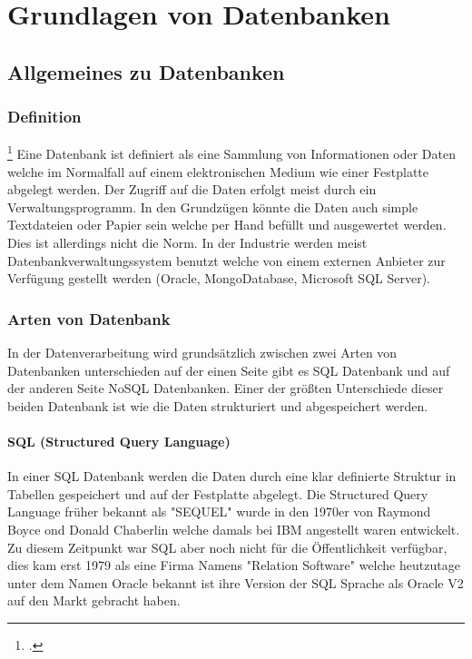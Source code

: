 \chapter{Grundlagen von Datenbanken}
\bauer

	\section{Allgemeines zu Datenbanken}
	
	\subsection{Definition}\footcite{oracle}
	Eine Datenbank ist definiert als eine Sammlung von Informationen oder Daten welche im Normalfall auf einem elektronischen Medium wie einer Festplatte abgelegt werden. Der Zugriff auf die Daten erfolgt meist durch ein Verwaltungsprogramm. In den Grundzügen könnte die Daten auch simple Textdateien oder Papier sein welche per Hand befüllt und ausgewertet werden. Dies ist allerdings nicht die Norm. In der Industrie werden meist Datenbankverwaltungssystem benutzt welche von einem externen Anbieter zur Verfügung gestellt werden (Oracle, MongoDatabase, Microsoft SQL Server).
	
	\subsection{Arten von Datenbank}
	In der Datenverarbeitung wird grundsätzlich zwischen zwei Arten von Datenbanken unterschieden auf der einen Seite gibt es SQL Datenbank und auf der anderen Seite NoSQL Datenbanken. Einer der größten Unterschiede dieser beiden Datenbank ist wie die Daten strukturiert und abgespeichert werden.
	
	\subsubsection{SQL (Structured Query Language)} 
	In einer SQL Datenbank werden die Daten durch eine klar definierte Struktur in Tabellen gespeichert und auf der Festplatte abgelegt. Die Structured Query Language früher bekannt als "SEQUEL" wurde in den 1970er von Raymond Boyce ond Donald Chaberlin welche damals bei IBM angestellt waren entwickelt. Zu diesem Zeitpunkt war SQL aber noch nicht für die Öffentlichkeit verfügbar, dies kam erst 1979 als eine Firma Namens "Relation Software" welche heutzutage unter dem Namen Oracle bekannt ist ihre Version der SQL Sprache als Oracle V2 auf den Markt gebracht haben.
	
